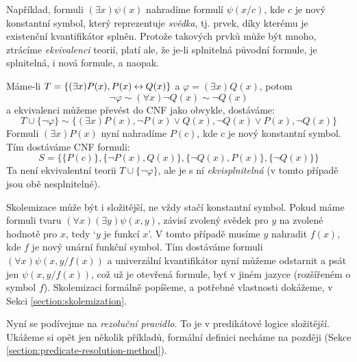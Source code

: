 Například, formuli $(\exists x)\psi(x)$ nahradíme formulí $\psi(x/c)$, kde $c$ je nový konstantní symbol, který reprezentuje \emph{svědka}, tj. prvek, díky kterému je existenční kvantifikátor splněn. Protože takových prvků může být mnoho, ztrácíme \emph{ekvivalenci} teorií, platí ale, že je-li splnitelná původní formule, je splnitelná, i nová formule, a naopak.

\begin{example}
  Máme-li $T=\{(\exists x)P(x),P(x)\mathbin{\leftrightarrow} Q(x)\}$ a $\varphi=(\exists x)Q(x)$, potom 
  $$
  \neg\varphi\sim(\forall x)\neg Q(x)\sim\neg Q(x)
  $$
  a ekvivalenci můžeme převést do CNF jako obvykle, dostáváme:
  $$
  T\cup\{\neg \varphi\}\sim\{(\exists x)P(x),\neg P(x)\lor Q(x),\neg Q(x)\lor P(x),\neg Q(x)\}
  $$
  Formuli $(\exists x)P(x)$ nyní nahradíme $P(c)$, kde $c$ je nový konstantní symbol. Tím dostáváme CNF formuli:
  $$
  S = \{\{P(c)\},\{\neg P(x),Q(x)\},\{\neg Q(x),P(x)\},\{\neg Q(x)\}\}
  $$
  Ta není ekvivalentní teorii $T\cup\{\neg \varphi\}$, ale je s ní \emph{ekvisplnitelná} (v tomto případě jsou obě nesplnitelné).
\end{example}

Skolemizace může být i složitější, ne vždy stačí konstantní symbol. Pokud máme formuli tvaru $(\forall x)(\exists y)\psi(x,y)$, závisí zvolený svědek pro $y$ na zvolené hodnotě pro $x$, tedy `$y$ je funkcí $x$'. V tomto případě musíme $y$ nahradit $f(x)$, kde $f$ je nový unární funkční symbol. Tím dostáváme formuli $(\forall x)\psi(x,y/f(x))$ a univerzální kvantifikátor nyní můžeme odstarnit a psát jen $\psi(x,y/f(x))$, což už je otevřená formule, byť v jiném jazyce (rozšířeném o symbol $f$). Skolemizaci formálně popíšeme, a potřebné vlastnosti dokážeme, v Sekci \ref{section:skolemization}. 

Nyní se podívejme na \emph{rezoluční pravidlo}. To je v predikátové logice složitější. Ukážeme si opět jen několik příkladů, formální definici necháme na později (Sekce \ref{section:predicate-resolution-method}).

